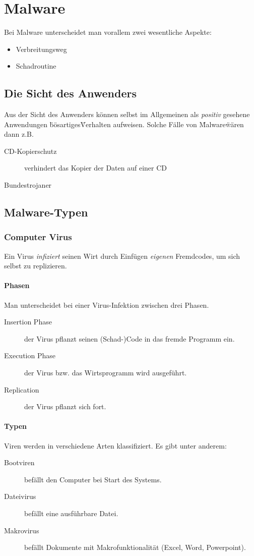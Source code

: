 \documentclass{report}
\begin{document}
\chapter{Malware}
Bei Malware unterscheidet man vorallem zwei wesentliche Aspekte:
\begin{itemize}
    \item Verbreitungsweg
    \item Schadroutine
\end{itemize}

\section{Die Sicht des Anwenders}
Aus der Sicht des Anwenders können selbst im Allgemeinen als \textit{positiv} gesehene Anwendungen \"bösartiges\" Verhalten aufweisen.
Solche Fälle von \"Malware\" wären dann z.B.
\begin{description}
    \item[CD-Kopierschutz] verhindert das Kopier der Daten auf einer CD
    \item[Bundestrojaner]  
\end{description}

\section{Malware-Typen}
\subsection{Computer Virus}
Ein Virus \textit{infiziert} seinen Wirt durch Einfügen \textit{eigenen} Fremdcodes, um sich selbst zu replizieren.
\subsubsection{Phasen}
Man unterscheidet bei einer Virus-Infektion zwischen drei Phasen.
\begin{description}
    \item[Insertion Phase] der Virus pflanzt seinen (Schad-)Code in das fremde Programm ein.
    \item[Execution Phase] der Virus bzw. das Wirtsprogramm wird ausgeführt.
    \item[Replication] der Virus pflanzt sich fort.
\end{description}
\subsubsection{Typen}
Viren werden in verschiedene Arten klassifiziert.
Es gibt unter anderem:
\begin{description}
    \item[Bootviren] befällt den Computer bei Start des Systems.
    \item[Dateivirus] befällt eine ausführbare Datei.
    \item[Makrovirus] befällt Dokumente mit Makrofunktionalität (Excel, Word, Powerpoint).   
\end{description}
\end{document}

